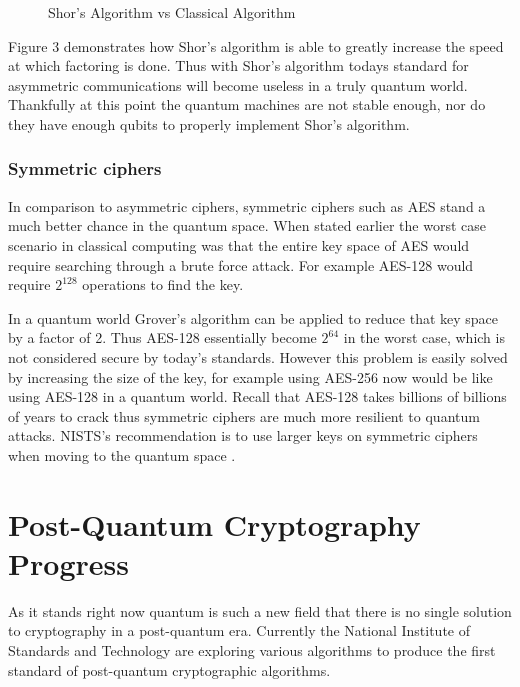 \documentclass[fleqn, 12pt]{article}
\begin{document}
\begin{figure}[h]
    \begin{center}
        \caption{Shor's Algorithm vs Classical Algorithm \cite{shorspeedup}}
        \label{fig:shor}
    \end{center}
\end{figure}

Figure 3 demonstrates how Shor's algorithm is able to greatly increase the speed at which factoring is done. Thus with Shor's algorithm todays standard for asymmetric communications will become useless in a truly quantum world. Thankfully at this point the quantum machines are not stable enough, nor do they have enough qubits to properly implement Shor's algorithm.

\subsubsection{Symmetric ciphers}

In comparison to asymmetric ciphers, symmetric ciphers such as AES stand a much better chance in the quantum space. When stated earlier the worst case scenario in classical computing was that the entire key space of AES would require searching through a brute force attack. For example AES-128 would require $2^{128}$ operations to find the key.

In a quantum world Grover's algorithm can be applied to reduce that key space by a factor of 2. Thus AES-128 essentially become $2^{64}$ in the worst case, which is not considered secure by today's standards\cite{grovers}. However this problem is easily solved by increasing the size of the key, for example using AES-256 now would be like using AES-128 in a quantum world. Recall that AES-128 takes billions of billions of years to crack thus symmetric ciphers are much more resilient to quantum attacks. NISTS's recommendation is to use larger keys on symmetric ciphers when moving to the quantum space \cite{nistplan}.

\section{Post-Quantum Cryptography Progress}

As it stands right now quantum is such a new field that there is no single solution to cryptography in a post-quantum era. Currently the National Institute of Standards and Technology are exploring various algorithms to produce the first standard of post-quantum cryptographic algorithms.
\end{document}
